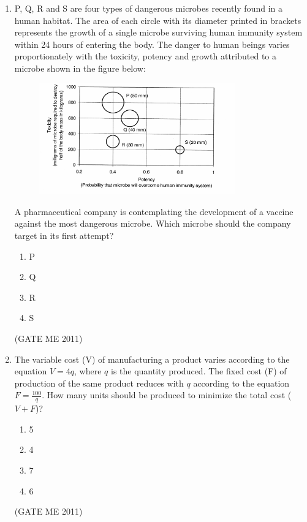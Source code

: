 \documentclass[journal]{IEEEtran}
\begin{document}
\begin{enumerate}
\item P, Q, R and S are four types of dangerous microbes recently found in a human habitat. The area of each circle with its diameter printed in brackets represents the growth of a single microbe surviving human immunity system within 24 hours of entering the body. The danger to human beings varies proportionately with the toxicity, potency and growth attributed to a microbe shown in the figure below:

\begin{figure}[H]
    \centering
    \includegraphics[width=0.8\textwidth]{Fig 13.png}
    \caption{}
    \label{fig:question63}
\end{figure}

A pharmaceutical company is contemplating the development of a vaccine against the most dangerous microbe. Which microbe should the company target in its first attempt?
\begin{multicols}{4}
  \begin{enumerate}
    \item P  
    \item Q  
    \item R  
    \item S  
  \end{enumerate}
\end{multicols}    
\hfill (GATE ME 2011)

\item The variable cost (V) of manufacturing a product varies according to the equation $ V = 4q $, where $ q $ is the quantity produced. The fixed cost (F) of production of the same product reduces with $ q $ according to the equation $ F = \frac{100}{q} $. How many units should be produced to minimize the total cost ($ V + F $)?
\begin{multicols}{4}
  \begin{enumerate}
    \item 5  
    \item 4  
    \item 7  
    \item 6  
  \end{enumerate}
\end{multicols}    
\hfill (GATE ME 2011)


\end{enumerate}
\end{document}
